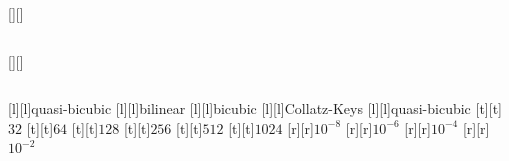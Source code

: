 %    
%
%
\begin{psfrags}%
\psfragscanon%
%
[][]{\color[rgb]{0,0,0}\setlength{\tabcolsep}{0pt}\begin{tabular}{c} \end{tabular}}%
[][]{\color[rgb]{0,0,0}\setlength{\tabcolsep}{0pt}\begin{tabular}{c} \end{tabular}}%
[l][l]{\color[rgb]{0,0,0}quasi-bicubic}%
[l][l]{\color[rgb]{0,0,0}bilinear}%
[l][l]{\color[rgb]{0,0,0}bicubic}%
[l][l]{\color[rgb]{0,0,0}Collatz-Keys}%
[l][l]{\color[rgb]{0,0,0}quasi-bicubic}%
%
[t][t]{$32$}%
[t][t]{$64$}%
[t][t]{$128$}%
[t][t]{$256$}%
[t][t]{$512$}%
[t][t]{$1024$}%
%
[r][r]{$10^{-8}$}%
[r][r]{$10^{-6}$}%
[r][r]{$10^{-4}$}%
[r][r]{$10^{-2}$}%
%
%
\end{psfrags}%
%
